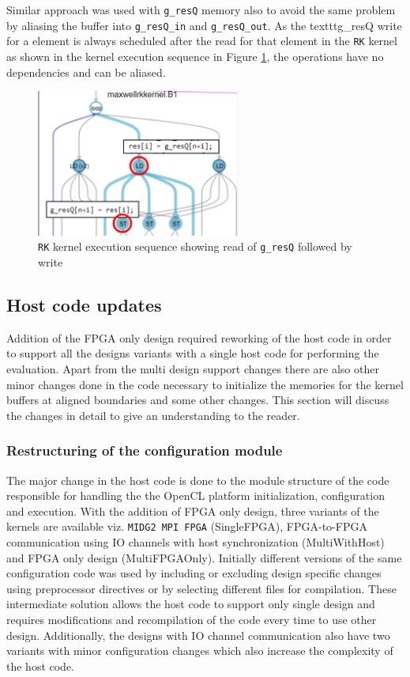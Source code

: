 Similar approach was used with \texttt{g\_resQ} memory also to
avoid the same problem by aliasing the buffer into \texttt{g\_resQ\_in} and \texttt{g\_resQ\_out}.
As the texttt{g\_resQ} write for a element is always scheduled after the read for that element in the
\texttt{RK} kernel as shown in the kernel execution sequence in Figure \ref{fig:resQSeq},
the operations have no dependencies and can be aliased.
\begin{figure}[ht]%
    \centering
    \includegraphics[width=0.6\textwidth]{images/resgSeq}
    \caption{\texttt{RK} kernel execution sequence showing read of \texttt{g\_resQ} followed by
    write}
    \label{fig:resQSeq}
\end{figure}

\subsection{Host code updates}
\label{sec:hostcodeupdate}

Addition of the FPGA only design required reworking of the host code in order to
support all the designs variants with a single host code for performing the evaluation.
Apart from the multi design support changes there are also other minor changes done in the code necessary
to initialize the memories for the kernel buffers at aligned boundaries and some other
changes. This section will discuss the changes in detail to give an understanding
to the reader.

\subsubsection*{Restructuring of the configuration module}

The major change in the host code is done to the module structure of
the code responsible for handling the the OpenCL platform initialization,
configuration and execution. With the addition of FPGA only design,
three variants of the kernels are available viz. \texttt{MIDG2 MPI FPGA} (SingleFPGA),
FPGA-to-FPGA communication using IO channels with host synchronization (MultiWithHost)
and FPGA only design (MultiFPGAOnly). Initially different versions of the same
configuration code was used by including or excluding design specific changes
using preprocessor directives or by selecting different files for compilation.
These intermediate solution allows the host code to support only single design
and requires modifications and recompilation of the code every time to use other
design. Additionally, the designs with IO channel communication also have two variants
with minor configuration changes which also increase the complexity of the host code.

